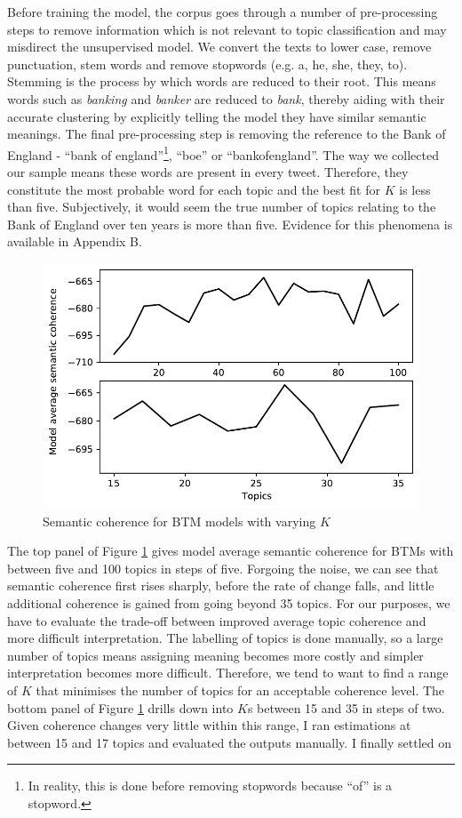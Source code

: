 \documentclass[11pt]{article}
\begin{document}
Before training the model, the corpus goes through a number of pre-processing steps to remove information which is not relevant to topic classification and may misdirect the unsupervised model. We convert the texts to lower case, remove punctuation, stem words and remove stopwords (e.g. a, he, she, they, to). Stemming is the process by which words are reduced to their root. This means words such as \emph{banking} and \emph{banker} are reduced to \emph{bank}, thereby aiding with their accurate clustering by explicitly telling the model they have similar semantic meanings. The final pre-processing step is removing the reference to the Bank of England - ``bank of england''\footnote{In reality, this is done before removing stopwords because ``of'' is a stopword.}, ``boe'' or ``bankofengland''. The way we collected our sample means these words are present in every tweet. Therefore, they constitute the most probable word for each topic and the best fit for $K$ is less than five. Subjectively, it would seem the true number of topics relating to the Bank of England over ten years is more than five. Evidence for this phenomena is available in Appendix B. 

\begin{figure}[h]
	\center
	\caption{Semantic coherence for BTM models with varying $K$} \label{fig:k search}
	\includegraphics[keepaspectratio = true]{k_search.pdf}
	\end{figure}

The top panel of Figure \ref{fig:k search} gives model average semantic coherence for BTMs with between five and 100 topics in steps of five. Forgoing the noise, we can see that semantic coherence first rises sharply, before the rate of change falls, and little additional coherence is gained from going beyond 35 topics. For our purposes, we have to evaluate the trade-off between improved average topic coherence and more difficult interpretation. The labelling of topics is done manually, so a large number of topics means assigning meaning becomes more costly and simpler interpretation becomes more difficult. Therefore, we tend to want to find a range of $K$ that minimises the number of topics for an acceptable coherence level. The bottom panel of Figure \ref{fig:k search} drills down into $K$s between 15 and 35 in steps of two. Given coherence changes very little within this range, I ran estimations at between 15 and 17 topics and evaluated the outputs manually. I finally settled on 
\end{document}

